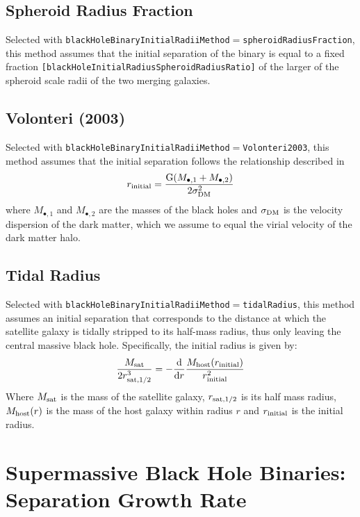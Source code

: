 \subsection{Spheroid Radius Fraction}

Selected with {\tt blackHoleBinaryInitialRadiiMethod}$=${\tt spheroidRadiusFraction}, this method assumes that the initial separation of the binary is equal to a fixed fraction {\tt [blackHoleInitialRadiusSpheroidRadiusRatio]} of the larger of the spheroid scale radii of the two merging galaxies.

\subsection{Volonteri (2003)}

Selected with {\tt blackHoleBinaryInitialRadiiMethod}$=${\tt Volonteri2003}, this method assumes that the initial separation follows the relationship described in \cite{volonteri_assembly_2003} 
\begin{equation}
 r_{\rm initial} = { {\rm G} (M_{\bullet,1} + M_{\bullet, 2}) \over 2
\sigma_{\rm DM}^2 }
\end{equation}
where $M_{\bullet, 1}$ and $M_{\bullet, 2}$ are the masses of the black holes
and $\sigma_{\rm DM}$ is the velocity dispersion of the dark matter, which we
assume to equal the virial velocity of the dark matter halo.

\subsection{Tidal Radius}

Selected with {\tt blackHoleBinaryInitialRadiiMethod}$=${\tt tidalRadius}, this method assumes an initial separation that corresponds to the distance at which the satellite galaxy is tidally stripped to its half-mass radius, thus only leaving the central massive black hole.
Specifically, the initial radius is given by:
\begin{equation}
{M_{\rm sat} \over 2 r_{\rm sat,1/2}^3 } = - {{\rm d} \over {\rm d} r} {M_{\rm host}(r_{\rm initial}) \over r_{\rm initial}^2}
\end{equation}
Where $M_{\rm sat}$ is the mass of the satellite galaxy, $r_{\rm sat,1/2}$ is its half mass radius, $M_{\rm host}(r)$ is the mass of the host galaxy within radius $r$ and $r_{\rm initial}$ is the initial radius.

\section{Supermassive Black Hole Binaries: Separation Growth Rate}

